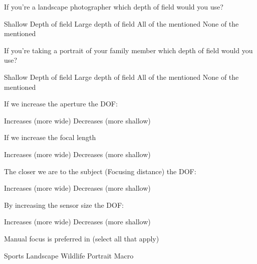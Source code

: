 \documentclass[theme=sleek, randomorder, hidesidemenu]{webquiz}
\begin{document}
\begin{question}
  If you're a landscape photographer which depth of field would you use?
  \begin{choice}[columns=2]
    \incorrect Shallow Depth of field
    \correct Large depth of field
    \incorrect All of the mentioned
    \incorrect None of the mentioned
  \end{choice}
\end{question}

\begin{question}
  If you're taking a portrait of your family member which depth of field would you use?
  \begin{choice}[columns=2]
    \correct Shallow Depth of field
    \incorrect Large depth of field
    \incorrect All of the mentioned
    \incorrect None of the mentioned
  \end{choice}
\end{question}

\begin{question}
  If we increase the aperture the DOF:
  \begin{choice}[columns=2]
    \incorrect Increases (more wide)
    \correct Decreases (more shallow)
  \end{choice}
\end{question}

\begin{question}
  If we increase the focal length
  \begin{choice}[columns=2]
    \incorrect Increases (more wide)
    \correct Decreases (more shallow)
  \end{choice}
\end{question}

\begin{question}
  The closer we are to the subject (Focusing distance) the DOF:
  \begin{choice}[columns=2]
    \incorrect Increases (more wide)
    \correct Decreases (more shallow)
  \end{choice}
\end{question}

\begin{question}
  By increasing the sensor size the DOF:
  \begin{choice}[columns=2]
    \correct Increases (more wide)
    \incorrect Decreases (more shallow)
  \end{choice}
\end{question}

\begin{question}
 Manual focus is preferred in (select all that apply)
  \begin{choice}[columns=2, multiple]
    \incorrect Sports
    \correct Landscape
    \incorrect Wildlife
    \correct Portrait
    \correct Macro
  \end{choice}
\end{question}
\end{document}
